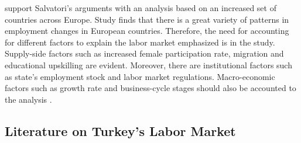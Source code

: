 \begin{onehalfspace}
\citet{2016FernandezMacias} support Salvatori's \citeyearpar{2018Salvatori}
arguments with an analysis based on an increased set of countries
across Europe. Study finds that there is a great variety of patterns
in employment changes in European countries. Therefore, the need for
accounting for different factors to explain the labor market emphasized
is in the study. Supply-side factors such as increased female participation
rate, migration and educational upskilling are evident. Moreover,
there are institutional factors such as state's employment stock and
labor market regulations. Macro-economic factors such as growth rate
and business-cycle stages should also be accounted to the analysis
\citep{2016FernandezMacias}.
\end{onehalfspace}

\subsection{Literature on Turkey's Labor Market}

